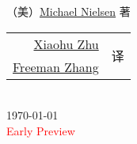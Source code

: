 \begin{titlepage}
\begin{center}
  \vspace{1cm}
  {\LARGE （美）\href{http://michaelnielsen.org/}{Michael Nielsen} 著}\\
  \vspace{1cm}
  {\Large
    \begin{tabular}{rl}
      \href{mailto:xhzhu.nju@gmail}{Xiaohu Zhu} & \multirow{2}{*}{译} \\
      \href{mailto:zhanggyb@gmail.com}{Freeman Zhang} & \\
    \end{tabular}
  }\\
  \vfill
  {\large \today}\\
  \vspace{1em}
  {\Huge\textcolor{red}{Early Preview}}
\end{center}
\end{titlepage}
